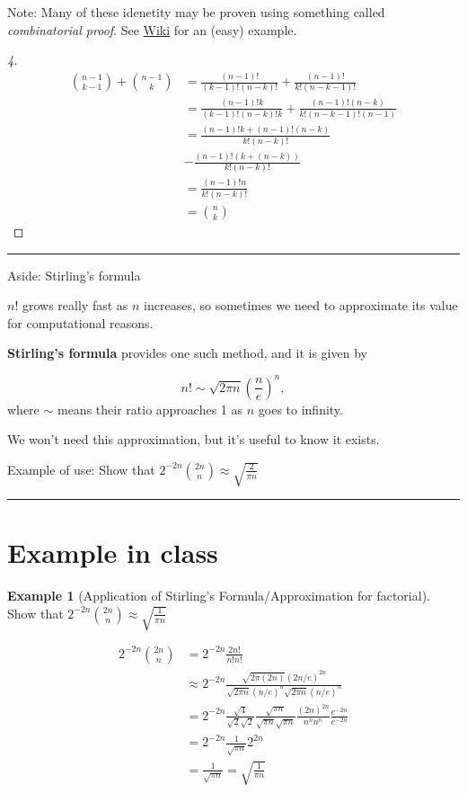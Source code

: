 \documentclass[
]{book}
\theoremstyle{definition}
\theoremstyle{definition}
\newtheorem{example}{Example}[chapter]
\theoremstyle{definition}
\theoremstyle{definition}
\theoremstyle{remark}
\begin{document}
Note: Many of these idenetity may be proven using something called \emph{combinatorial proof}. See \href{https://en.wikipedia.org/wiki/Combinatorial_proof}{Wiki} for an (easy) example.

\begin{proof}[4]
\begin{align*}
{n-1 \choose k-1} + {n-1 \choose k} &= \frac{(n-1)!}{(k-1)! (n-k)!} + \frac{(n-1)!}{k! (n-k-1)!}\\
&= \frac{(n-1)!k }{(k-1)! (n-k)!k} + \frac{(n-1)!(n-k)}{k! (n-k-1)!(n-1)} \\
&= \frac{(n-1)!k + (n-1)! (n-k)}{k! (n-k)!} \\
&- \frac{(n-1)!( k + (n-k))}{k! (n-k)!} \\
&= \frac{(n-1)! n}{k! (n-k)!} \\
&= {n \choose k}
\end{align*}
\end{proof}

\begin{center}\rule{0.5\linewidth}{0.5pt}\end{center}

Aside: Stirling's formula

\(n!\) grows really fast as \(n\) increases, so sometimes we need to approximate its value for computational reasons.

\textbf{Stirling's formula} provides one such method, and it is given by

\[
n! \sim \sqrt{2 \pi n} \left( \frac{n}{e} \right)^n,
\]
where \(\sim\) means their ratio approaches 1 as \(n\) goes to infinity.

We won't need this approximation, but it's useful to know it exists.

Example of use:
Show that \(2^{-2n}\binom{2n}{n} \approx \sqrt{\frac{2}{\pi n}}\)

\begin{center}\rule{0.5\linewidth}{0.5pt}\end{center}

\section{Example in class}\label{example-in-class}

\begin{example}[Application of Stirling's Formula/Approximation for factorial]
Show that \(2^{-2n}{2n \choose n} \approx \sqrt{\frac{1}{\pi n}}\)

\begin{align*}
  2^{-2n}{2n \choose n} &= 2^{-2n}\frac{2n!}{n!n!} \\
  &\approx 2^{-2n} \frac{\sqrt{2\pi (2n)} (2n/e)^{2n}}{\sqrt{2\pi n} (n/e)^{n}\sqrt{2\pi n} (n/e)^{n}}\\
  &= 2^{-2n} \frac{\sqrt{4}}{\sqrt{2}\sqrt{2}} \frac{\sqrt{\pi n}}{\sqrt{\pi n}\sqrt{\pi n}} \frac{(2n)^{2n}}{n^n n^n} \frac{e^{-2n}}{e^{-2n}}\\
  &=  2^{-2n} \frac{1}{\sqrt{\pi n}} 2^{2n}\\
  &= \frac{1}{\sqrt{\pi n}} = \sqrt{\frac{1}{\pi n}}
\end{align*}
\end{example}
\end{document}
